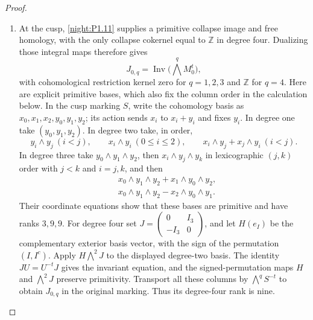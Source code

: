 \documentclass[11pt,a4paper]{article}
\numberwithin{equation}{section}
\theoremstyle{definition}
\begin{document}
\begin{proof}
\begin{enumerate}[label=\arabic*.,leftmargin=*]
We fix its column basis as follows.  Exterior coordinates are in
increasing lexicographic order, with indices starting at zero.
For each signed-permutation orbit, start at its least coordinate
and sum its successive signed images until it returns there.
A positive orbit of length $l$ gives a primitive invariant column;
the norm image has the column $m_i/l$ times that column.
A negative orbit has zero invariant lattice and one $\mathbb Z/2$
in its coinvariant group.  Indeed the successive relations identify
all its coordinates with signed copies of the first, and the last
relation is twice that first coordinate.  Order the positive orbits
by their least coordinates, with vertical columns before horizontal
columns.  For $D_1$ there is no torsion in vertical degrees $1$ through
$4$.  For $D_2$ there is one negative orbit in each such degree; the
positive-orbit counts are $1,2,2,1$.

\item At the cusp, \cref{night:P1.11} supplies a primitive collapse
image and free homology, with the only collapse cokernel equal to
$\mathbb Z$ in degree four.  Dualizing those integral maps therefore
gives
\[
 J_{0,q}=\operatorname{Inv}\bigl(\bigwedge^q M_0^t\bigr),
\]
with cohomological restriction kernel zero for $q=1,2,3$ and
$\mathbb Z$ for $q=4$.
Here are explicit primitive bases, which also fix the column order
in the calculation below.  In the cusp marking $S$, write
the cohomology basis as $x_0,x_1,x_2,y_0,y_1,y_2$; its action sends
$x_i$ to $x_i+y_i$ and fixes $y_i$.
In degree one take $(y_0,y_1,y_2)$.  In degree two take, in order,
\[
 y_i\wedge y_j\ (i<j),\qquad
 x_i\wedge y_i\ (0\le i\le2),\qquad
 x_i\wedge y_j+x_j\wedge y_i\ (i<j).
\]
In degree three take $y_0\wedge y_1\wedge y_2$, then
$x_i\wedge y_j\wedge y_k$ in lexicographic $(j,k)$ order with
$j<k$ and $i=j,k$, and then
\[
\begin{split}
 &x_0\wedge y_1\wedge y_2+x_1\wedge y_0\wedge y_2,\\
 &x_0\wedge y_1\wedge y_2-x_2\wedge y_0\wedge y_1.
\end{split}
\]
Their coordinate equations show that these bases are primitive and
have ranks $3,9,9$.  For degree four set
$J=\left(\begin{smallmatrix}0&I_3\\-I_3&0\end{smallmatrix}\right)$,
and let $H(e_I)$ be the complementary exterior basis vector, with
the sign of the permutation $(I,I^c)$.  Apply
$H\bigwedge^2J$ to the displayed degree-two basis.
The identity $JU=U^{-t}J$ gives the invariant equation, and the
signed-permutation maps $H$ and $\bigwedge^2J$ preserve primitivity.
Transport all these columns by $\bigwedge^qS^{-t}$ to obtain
$J_{0,q}$ in the original marking.  Thus its degree-four rank is nine.


\end{enumerate}
\end{proof}
\end{document}
